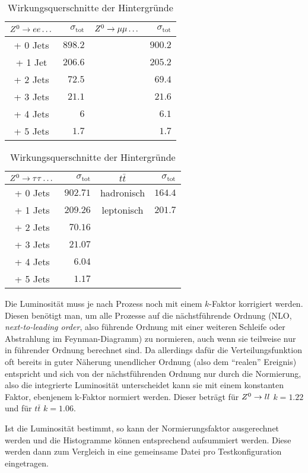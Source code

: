\begin{table}
  \centering
  \begin{tabular}{cr|cr}
    \toprule
    $Z^0\to ee \dots$ & $\sigma_{\mathrm{tot}}$ & $Z^0\to\mu\mu \dots$ &
    $\sigma_{\mathrm{tot}}$ \\
    \midrule[0.75pt]
    + 0 Jets &  $898.2$ & & $900.2$ \\
    + 1 Jet &   $206.6$ & & $205.2$ \\
    + 2 Jets &  $72.5$  & & $69.4$ \\
    + 3 Jets &  $21.1$  & & $21.6$ \\
    + 4 Jets &  $6$  & & $6.1$ \\
    + 5 Jets &  $1.7$  & & $1.7$ \\
    \bottomrule
  \end{tabular}
  \begin{tabular}{cr|cr}
    \toprule
    $Z^0\to\tau\tau \dots$ & $\sigma_{\mathrm{tot}}$ & $t\bar{t}$ &
    $\sigma_{\mathrm{tot}}$ \\
    \midrule[0.75pt]
    + 0 Jets &  $902.71$  & hadronisch & $164.4$ \\
    + 1 Jets &  $209.26$  & leptonisch & $201.7$ \\
    + 2 Jets &  $70.16$  & & \\
    + 3 Jets &  $21.07$  & & \\
    + 4 Jets &  $6.04$  & & \\
    + 5 Jets &  $1.17$  & & \\
    \bottomrule
  \end{tabular}
  \caption{Wirkungsquerschnitte der Hintergründe}
  \label{tab:wqs}
\end{table}

Die Luminosität muss je nach Prozess noch mit einem $k$-Faktor korrigiert
werden. Diesen benötigt man, um alle Prozesse auf die nächstführende Ordnung
(NLO, \emph{next-to-leading order}, also führende Ordnung mit einer weiteren
Schleife oder Abstrahlung im Feynman-Diagramm) zu normieren, auch wenn sie
teilweise nur in führender Ordnung berechnet sind. Da allerdings dafür die
Verteilungsfunktion oft bereits in guter Näherung unendlicher Ordnung (also dem
"`realen"' Ereignis) entspricht und sich von der nächstführenden Ordnung nur
durch die Normierung, also die integrierte Luminosität unterscheidet kann sie
mit einem konstanten Faktor, ebenjenem k-Faktor normiert werden. Dieser beträgt
für $Z^0\to ll$ $k = 1.22$ und für $t\bar{t}$ $k=1.06$.\cite{10tev}

Ist die Luminosität bestimmt, so kann der Normierungsfaktor ausgerechnet werden
und die Histogramme können entsprechend aufsummiert werden. Diese werden dann
zum Vergleich in eine gemeinsame Datei pro Testkonfiguration eingetragen.
